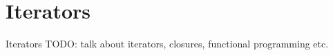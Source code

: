 \documentclass[usenames,dvipsnames,10pt,aspectratio=169]{beamer}
\begin{document}

\section{Iterators}

\begin{frame}{Iterators}
	\large
	\textcolor{ucured}{TODO: talk about iterators, closures, functional programming etc.}
	
\end{frame}
 

\end{document}

